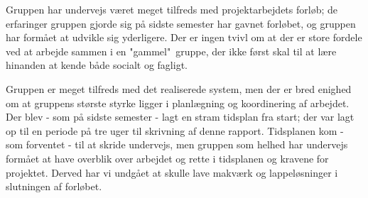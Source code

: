 Gruppen har undervejs været meget tilfreds med projektarbejdets forløb; de erfaringer gruppen gjorde sig på sidste semester har gavnet forløbet, og gruppen har formået at udvikle sig yderligere. 
Der er ingen tvivl om at der er store fordele ved at arbejde sammen i en "gammel"\ gruppe, der ikke først skal til at lære hinanden at kende både socialt og fagligt. 

Gruppen er meget tilfreds med det realiserede system, men der er bred enighed om at gruppens største styrke ligger i planlægning og koordinering af arbejdet. 
Der blev - som på sidste semester - lagt en stram tidsplan fra start; der var lagt op til en periode på tre uger til skrivning af denne rapport. 
Tidsplanen kom - som forventet - til at skride undervejs, men gruppen som helhed har undervejs formået at have overblik over arbejdet og rette i tidsplanen og kravene for projektet. 
Derved har vi undgået at skulle lave makværk og lappeløsninger i slutningen af forløbet. 

\clearpage